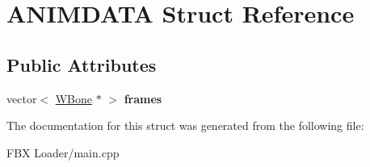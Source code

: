 \hypertarget{struct_a_n_i_m_d_a_t_a}{}\section{A\+N\+I\+M\+D\+A\+TA Struct Reference}
\label{struct_a_n_i_m_d_a_t_a}
\subsection*{Public Attributes}
\begin{DoxyCompactItemize}
\item 
vector$<$ \hyperlink{class_w_bone}{W\+Bone} $\ast$ $>$ {\bfseries frames}\hypertarget{struct_a_n_i_m_d_a_t_a_a3b7f166311190bee00a3064fd8e886aa}{}\label{struct_a_n_i_m_d_a_t_a_a3b7f166311190bee00a3064fd8e886aa}

\end{DoxyCompactItemize}


The documentation for this struct was generated from the following file\+:\begin{DoxyCompactItemize}
\item 
F\+B\+X Loader/main.\+cpp\end{DoxyCompactItemize}
